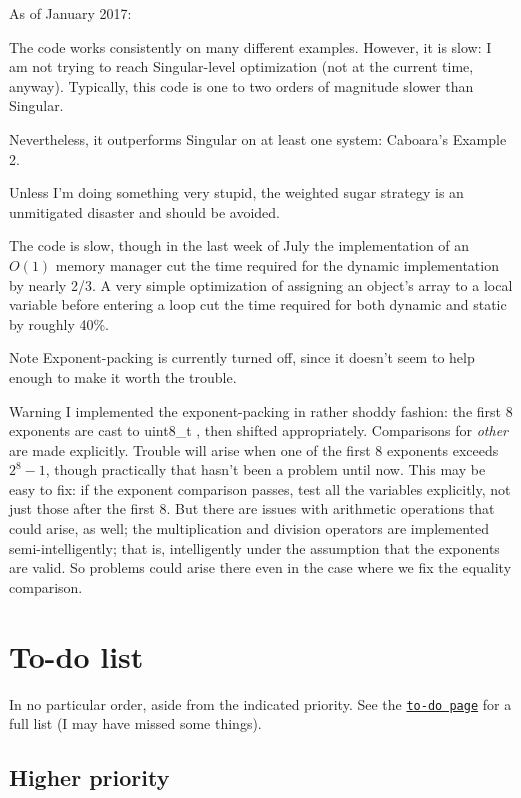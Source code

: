 As of January 2017\+: \begin{DoxyItemize}
\item The code works consistently on many different examples. However, it is slow\+: I am not trying to reach Singular-\/level optimization (not at the current time, anyway). Typically, this code is one to two orders of magnitude slower than Singular. \item Nevertheless, it outperforms Singular on at least one system\+: Caboara's Example 2. \item Unless I'm doing something very stupid, the weighted sugar strategy is an unmitigated disaster and should be avoided. \item The code is slow, though in the last week of July the implementation of an $O(1)$ memory manager cut the time required for the dynamic implementation by nearly 2/3. A very simple optimization of assigning an object's array to a local variable before entering a loop cut the time required for both dynamic and static by roughly 40\%.\end{DoxyItemize}
\begin{DoxyNote}{Note}
Exponent-\/packing is currently turned off, since it doesn't seem to help enough to make it worth the trouble.
\end{DoxyNote}
\begin{DoxyWarning}{Warning}
I implemented the exponent-\/packing in rather shoddy fashion\+: the first 8 exponents are cast to {\ttfamily uint8\+\_\+t} , then shifted appropriately. Comparisons for {\itshape other} are made explicitly. Trouble will arise when one of the first 8 exponents exceeds $2^8-1$, though practically that hasn't been a problem until now. This may be easy to fix\+: if the exponent comparison passes, test all the variables explicitly, not just those after the first 8. But there are issues with arithmetic operations that could arise, as well; the multiplication and division operators are implemented semi-\/intelligently; that is, intelligently under the assumption that the exponents are valid. So problems could arise there even in the case where we fix the equality comparison.
\end{DoxyWarning}
\hypertarget{index_Todo}{}\section{To-\/do list}\label{index_Todo}
In no particular order, aside from the indicated priority. See the \href{todo.html}{\tt to-\/do page} for a full list (I may have missed some things).\hypertarget{index_hipri}{}\subsection{Higher priority}\label{index_hipri}
